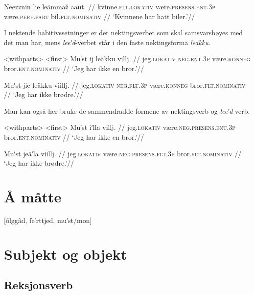 \begingl %
\gla Neezznin lie leämmaž aaut. //
\glb kvinne.\textsc{flt.lokativ} være.\textsc{presens.ent.3p} være.\textsc{perf.part} bil.\textsc{flt.nominativ} //
\glft `Kvinnene har hatt biler.'//
\endgl
\xe

I nektende habitivssetninger er det nektingsverbet som skal samsvarsbøyes med det man har, mens \textit{leeʹd}-verbet står i den faste nektingsforma \textit{leäkku}.

\pex<withparts> %
\a<first> %
\begingl %
\gla Muʹst ij leäkku villj. //
\glb jeg.\textsc{lokativ} \textsc{neg.ent.3p} være.\textsc{konneg} bror.\textsc{ent.nominativ} //
\glft `Jeg har ikke en bror.'//
\endgl

\begingl %
\gla Muʹst jie leäkku viillj. //
\glb jeg.\textsc{lokativ} \textsc{neg.flt.3p} være.\textsc{konneg} bror.\textsc{flt.nominativ} //
\glft `Jeg har ikke brødre.'//
\endgl
\xe

Man kan også her bruke de sammendradde formene av nektingsverb og \textit{leeʹd}-verb.

\pex<withparts> %
\a<first> %
\begingl %
\gla Muʹst iʹlla villj. //
\glb jeg.\textsc{lokativ} være.\textsc{neg.presens.ent.3p} bror.\textsc{ent.nominativ} //
\glft `Jeg har ikke en bror.'//
\endgl

\begingl %
\gla Muʹst jeäʹla viillj. //
\glb jeg.\textsc{lokativ} være.\textsc{neg.presens.flt.3p} bror.\textsc{flt.nominativ} //
\glft `Jeg har ikke brødre.'//
\endgl
\xe

\section{Å måtte}

[õlggâd, feʹrttjed, muʹst/mon]

\section{Subjekt og objekt}

\subsection{Reksjonsverb}

